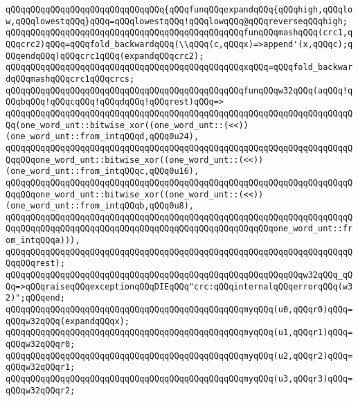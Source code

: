 \verb|qQQqqQQqqQQqqQQqqQQqqQQqqQQqqQQq{qQQqfunqQQqexpandqQQq{qQQqhigh,qQQqlow,qQQqlowestqQQq}qQQq=qQQqlowestqQQq!qQQqlowqQQq@qQQqreverseqQQqhigh;|\newline
\verb|qQQqqQQqqQQqqQQqqQQqqQQqqQQqqQQqqQQqqQQqqQQqqQQqfunqQQqmashqQQq(crc1,qQQqcrc2)qQQq=qQQqfold_backwardqQQq(\\qQQq(c,qQQqx)=>append'(x,qQQqc);qQQqendqQQq)qQQqcrc1qQQq(expandqQQqcrc2);|\newline
\verb|qQQqqQQqqQQqqQQqqQQqqQQqqQQqqQQqqQQqqQQqqQQqqQQqxqQQq=qQQqfold_backwardqQQqmashqQQqcrc1qQQqcrcs;|\newline
\newline
\verb|qQQqqQQqqQQqqQQqqQQqqQQqqQQqqQQqqQQqqQQqqQQqqQQqfunqQQqw32qQQq(aqQQq!qQQqbqQQq!qQQqcqQQq!qQQqdqQQq!qQQqrest)qQQq=>|\newline
\verb|qQQqqQQqqQQqqQQqqQQqqQQqqQQqqQQqqQQqqQQqqQQqqQQqqQQqqQQqqQQqqQQqqQQqqQQq(one_word_unt::bitwise_xor((one_word_unt::(<<))(one_word_unt::from_intqQQqd,qQQq0u24),|\newline
\verb|qQQqqQQqqQQqqQQqqQQqqQQqqQQqqQQqqQQqqQQqqQQqqQQqqQQqqQQqqQQqqQQqqQQqqQQqqQQqone_word_unt::bitwise_xor((one_word_unt::(<<))(one_word_unt::from_intqQQqc,qQQq0u16),|\newline
\verb|qQQqqQQqqQQqqQQqqQQqqQQqqQQqqQQqqQQqqQQqqQQqqQQqqQQqqQQqqQQqqQQqqQQqqQQqqQQqone_word_unt::bitwise_xor((one_word_unt::(<<))(one_word_unt::from_intqQQqb,qQQq0u8),|\newline
\verb|qQQqqQQqqQQqqQQqqQQqqQQqqQQqqQQqqQQqqQQqqQQqqQQqqQQqqQQqqQQqqQQqqQQqqQQqqQQqqQQqqQQqqQQqqQQqqQQqqQQqqQQqqQQqqQQqqQQqqQQqqQQqone_word_unt::from_intqQQqa))),|\newline
\verb|qQQqqQQqqQQqqQQqqQQqqQQqqQQqqQQqqQQqqQQqqQQqqQQqqQQqqQQqqQQqqQQqqQQqqQQqqQQqrest);|\newline
\verb|qQQqqQQqqQQqqQQqqQQqqQQqqQQqqQQqqQQqqQQqqQQqqQQqqQQqqQQqqQQqw32qQQq_qQQq=>qQQqraiseqQQqexceptionqQQqDIEqQQq"crc:qQQqinternalqQQqerrorqQQq(w32)";qQQqend;|\newline
\newline
\verb|qQQqqQQqqQQqqQQqqQQqqQQqqQQqqQQqqQQqqQQqqQQqqQQqmyqQQq(u0,qQQqr0)qQQq=qQQqw32qQQq(expandqQQqx);|\newline
\verb|qQQqqQQqqQQqqQQqqQQqqQQqqQQqqQQqqQQqqQQqqQQqqQQqmyqQQq(u1,qQQqr1)qQQq=qQQqw32qQQqr0;|\newline
\verb|qQQqqQQqqQQqqQQqqQQqqQQqqQQqqQQqqQQqqQQqqQQqqQQqmyqQQq(u2,qQQqr2)qQQq=qQQqw32qQQqr1;|\newline
\verb|qQQqqQQqqQQqqQQqqQQqqQQqqQQqqQQqqQQqqQQqqQQqqQQqmyqQQq(u3,qQQqr3)qQQq=qQQqw32qQQqr2;|\newline
